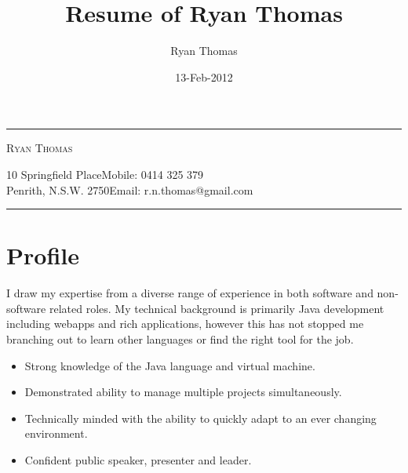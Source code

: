 \documentclass[a4paper]{article}
\author{Ryan Thomas}
\title{Resume of Ryan Thomas}
\date{13-Feb-2012}
\begin{document}
\newcommand{\ryanHeader}{
\begin{center}
\rule{14.1cm}{0.5mm}
\end{center}
\vspace{-0.6cm}
\begin{center}
\textsc{Ryan Thomas}
\end{center}
\vspace{-0.3cm}
10 Springfield Place\hfill Mobile: 0414 325 379~~\\
Penrith, N.S.W. 2750\hfill Email: r.n.thomas@gmail.com
\vspace{-0.3cm}
\begin{center}
\rule{14.1cm}{0.5mm}
\end{center}}

\newcommand{\ryanHeaderSmall}{
\begin{center}
\rule{14.1cm}{0.5mm}
\end{center}
\vspace{-0.55cm}
\begin{center}
\textsc{Ryan Thomas}
\end{center}
\vspace{-0.8cm}
\begin{center}
\rule{14.1cm}{0.5mm}
\end{center}}

\ryanHeader
\section*{Profile}
I draw my expertise from a diverse range of experience in both software and non-software related roles. My technical background is primarily Java development including webapps and rich applications, however this has not stopped me branching out to learn other languages or find the right tool for the job.
\begin{itemize}
\item Strong knowledge of the Java language and virtual machine.
\item Demonstrated ability to manage multiple projects simultaneously.
\item Technically minded with the ability to quickly adapt to an ever changing environment.
\item Confident public speaker, presenter and leader.
\end{itemize}
\end{document}
